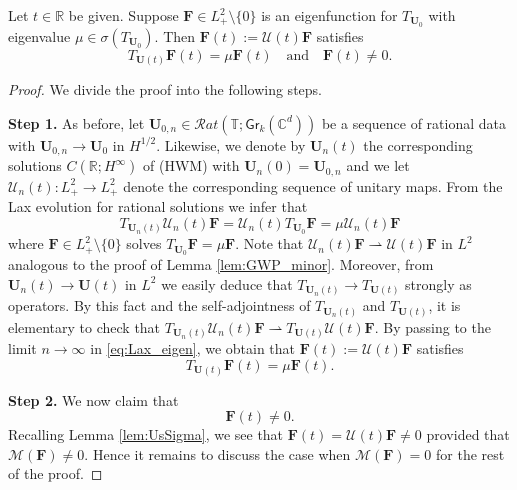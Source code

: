 \documentclass[10pt,a4paper]{amsart}
\newcommand{\C}{\mathbb{C}}
\newcommand{\Fb}{\mathbf{F}}
\newcommand{\Gr}{\mathsf{Gr}}
\newcommand{\Mean}{\mathscr{M}}
\newcommand{\R}{\mathbb{R}}
\newcommand{\T}{\mathbb{T}}
\newcommand{\Ub}{\mathbf{U}}
\newcommand{\Us}{\mathscr{U}}
\newcommand{\be}{\begin{equation}}
\newcommand{\ee}{\end{equation}}
\newcommand{\weakto}{\rightharpoonup}
\begin{document}
\begin{lem} \label{lem:eigenfunctions}
Let $t \in \R$ be given. Suppose $\Fb \in L^2_+ \setminus \{ 0 \}$ is an eigenfunction for $T_{\Ub_0}$ with eigenvalue $\mu \in \sigma(T_{\Ub_0})$. Then $\Fb(t) := \Us(t) \Fb$ satisfies
$$
T_{\Ub(t)} \Fb(t) = \mu \Fb(t) \quad \mbox{and} \quad \Fb(t) \neq 0.
$$
\end{lem}

\begin{proof}
We divide the proof into the following steps.

\medskip
\textbf{Step 1.} As before, let $\Ub_{0,n} \in \mathcal{R}at(\T; \Gr_k(\C^d))$ be a sequence of rational data with $\Ub_{0,n} \to \Ub_0$ in $H^{1/2}$. Likewise, we denote by $\Ub_n(t)$ the corresponding solutions $C(\R; H^\infty)$ of (HWM) with $\Ub_n(0) = \Ub_{0,n}$ and we let $\Us_n(t) : L^2_+ \to L^2_+$ denote the corresponding sequence of unitary maps. From the Lax evolution for rational solutions we infer that
\be \label{eq:Lax_eigen}
T_{\Ub_n(t)} \Us_n(t) \Fb = \Us_n(t) T_{\Ub_0} \Fb = \mu \Us_n(t) \Fb
\ee
where $\Fb \in L^2_+ \setminus \{ 0 \}$ solves $T_{\Ub_0} \Fb = \mu \Fb$. Note that $\Us_n(t) \Fb \weakto \Us(t) \Fb$ in $L^2$ analogous to the proof of Lemma \ref{lem:GWP_minor}. Moreover, from $\Ub_n(t) \to \Ub(t)$ in $L^2$ we easily deduce that $T_{\Ub_n(t)} \to T_{\Ub(t)}$ strongly as operators. By this fact and the self-adjointness of $T_{\Ub_n(t)}$ and $T_{\Ub(t)}$, it is elementary to check that $T_{\Ub_n(t)} \Us_n(t) \Fb \weakto T_{\Ub(t)} \Us(t) \Fb$. By passing to the limit $n \to \infty$ in \eqref{eq:Lax_eigen}, we obtain that $\Fb(t) := \Us(t) \Fb$ satisfies
$$
T_{\Ub(t)} \Fb(t) = \mu \Fb(t) .
$$

\medskip
\textbf{Step 2.} We now claim that 
$$
\Fb(t) \neq 0 .
$$
Recalling Lemma \ref{lem:UsSigma}, we see that $\Fb(t) = \Us(t) \Fb \neq 0$ provided that $\Mean(\Fb) \neq 0$. Hence it remains to discuss the case when $\Mean(\Fb) = 0$ for the rest of the proof.


\end{proof}
\end{document}
